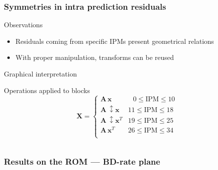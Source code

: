 \documentclass[10pt]{beamer} %
\makeatletter
\newcommand*{\currentname}{\@currentlabelname}
\def\x{\mathbf{x}}
\def\X{\mathbf{X}}
\def\A{\mathbf{A}}
\makeatother
\begin{document}
\subsubsection{Symmetries in intra prediction residuals}

\begin{frame}{\currentname}
	\begin{block}{Observations}
		\begin{itemize}
			\item Residuals coming from specific IPMs present geometrical
				relations
			\item With proper manipulation, transforms can be reused
		\end{itemize}
	\end{block}
	\vspace{-0.5em}
	\begin{minipage}{0.48\textwidth}
		\begin{block}{Graphical interpretation}
			\centering
			
		\end{block}
	\end{minipage}
	\hfill
	\begin{minipage}{0.48\textwidth}
		\begin{block}{Operations applied to blocks}
			$$\X =
			\begin{cases}
				\A \, \x & \;\;\, 0 \le \text{IPM} \le 10 \\
				\A \, \updownarrow\x & 11 \le \text{IPM} \le 18 \\
				\A \, \updownarrow\x^T & 19 \le \text{IPM} \le 25 \\
				\A \, \x^T & 26 \le \text{IPM} \le 34 \\
			\end{cases}$$
		\end{block}
		\vfill$\,$
	\end{minipage}
\end{frame}

\subsubsection{Results on the ROM --- BD-rate plane}

\begin{frame}{\currentname}

	
\end{frame}
\end{document}
